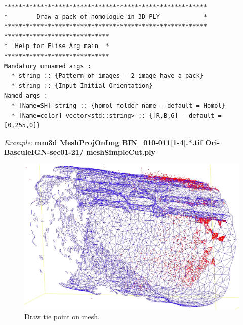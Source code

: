 \begin{verbatim}
********************************************************
*        Draw a pack of homologue in 3D PLY            *
********************************************************
*****************************
*  Help for Elise Arg main  *
*****************************
Mandatory unnamed args : 
  * string :: {Pattern of images - 2 image have a pack}
  * string :: {Input Initial Orientation}
Named args : 
  * [Name=SH] string :: {homol folder name - default = Homol}
  * [Name=color] vector<std::string> :: {[R,B,G] - default = [0,255,0]}

\end{verbatim}
\textit{Example:}
\textbf{mm3d MeshProjOnImg BIN\_010-011[1-4].*.tif Ori-BasculeIGN-sec01-21/ meshSimpleCut.ply}

\begin{figure}[H]
\centering
\includegraphics[width=15cm]{FIGS/MeshProjOnImg/TiePOnMesh.jpeg}
\caption{Draw tie point on mesh.}
\label{SurfCorr}
\end{figure}


